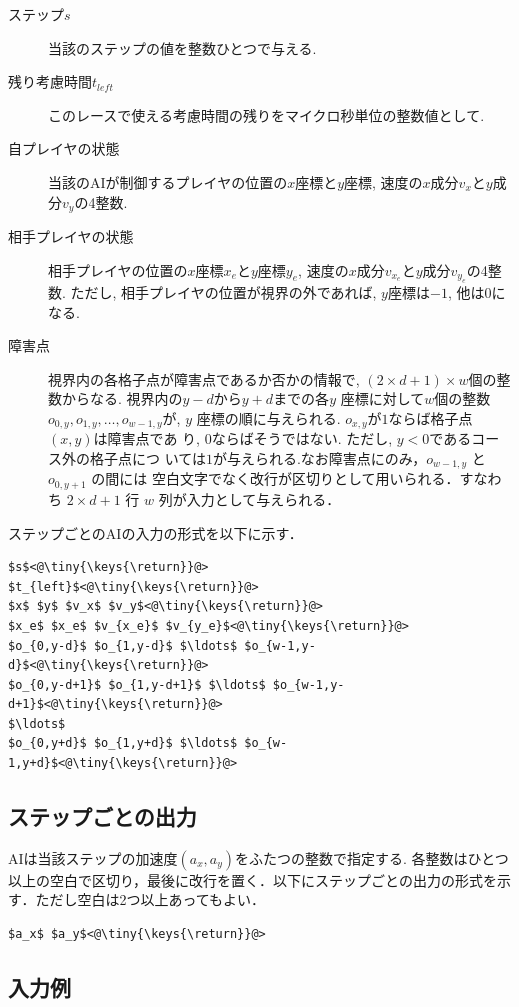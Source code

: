\documentclass[11pt]{jarticle}
\begin{document}
\begin{description}
\item[ステップ$s$] 当該のステップの値を整数ひとつで与える.
\item[残り考慮時間$t_{left}$] このレースで使える考慮時間の残りをマイクロ秒単位の整数値として.
\item[自プレイヤの状態] 当該のAIが制御するプレイヤの位置の$x$座標と$y$座標, 速度の$x$成分$v_x$と$y$成分$v_y$の4整数.
\item[相手プレイヤの状態] 相手プレイヤの位置の$x$座標$x_e$と$y$座標$y_e$, 速度の$x$成分$v_{x_e}$と$y$成分$v_{y_e}$の4整数.
  ただし, 相手プレイヤの位置が視界の外であれば, $y$座標は$-1$, 他は$0$になる.
\item[障害点] 視界内の各格子点が障害点であるか否かの情報で,
  $(2\times d+1)\times w$個の整数からなる. 視界内の$y-d$から$y+d$までの各$y$
  座標に対して$w$個の整数$o_{0,y}, o_{1,y}, \ldots, o_{w-1,y}$が, $y$
  座標の順に与えられる.  $o_{x,y}$が$1$ならば格子点$(x,y)$は障害点であ
  り, $0$ならばそうではない.  ただし, $y<0$であるコース外の格子点につ
  いては$1$が与えられる.なお障害点にのみ，$o_{w-1,y}$ と $o_{0,y+1}$ の間には
  空白文字でなく改行が区切りとして用いられる．すなわち $2\times d+1$ 行 $w$ 列が入力として与えられる．
\end{description}

ステップごとのAIの入力の形式を以下に示す．
\begin{lstlisting}
$s$<@\tiny{\keys{\return}}@>
$t_{left}$<@\tiny{\keys{\return}}@>
$x$ $y$ $v_x$ $v_y$<@\tiny{\keys{\return}}@>
$x_e$ $x_e$ $v_{x_e}$ $v_{y_e}$<@\tiny{\keys{\return}}@>
$o_{0,y-d}$ $o_{1,y-d}$ $\ldots$ $o_{w-1,y-d}$<@\tiny{\keys{\return}}@>
$o_{0,y-d+1}$ $o_{1,y-d+1}$ $\ldots$ $o_{w-1,y-d+1}$<@\tiny{\keys{\return}}@>
$\ldots$
$o_{0,y+d}$ $o_{1,y+d}$ $\ldots$ $o_{w-1,y+d}$<@\tiny{\keys{\return}}@>
\end{lstlisting}

\subsection{ステップごとの出力}
AIは当該ステップの加速度$(a_x,a_y)$をふたつの整数で指定する.
各整数はひとつ以上の空白で区切り，最後に改行を置く．以下にステップごとの出力の形式を示す．ただし空白は2つ以上あってもよい．

\begin{lstlisting}
$a_x$ $a_y$<@\tiny{\keys{\return}}@>
\end{lstlisting}

\subsection{入力例}
\end{document}
